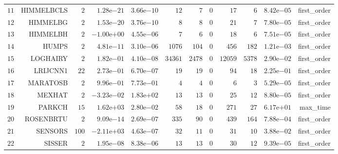 \begin{longtable}{rrrrrrrrrrrr}
  \(    11\) & HIMMELBCLS & \(     2\) & \( 1.28\)e\(-21\) & \( 3.66\)e\(-10\) & \(    12\) & \(     7\) & \(     0\) & \(    17\) & \(     6\) & \( 8.42\)e\(-05\) & first\_order \\
  \(    12\) & HIMMELBG & \(     2\) & \( 1.53\)e\(-20\) & \( 3.76\)e\(-10\) & \(     8\) & \(     8\) & \(     0\) & \(    21\) & \(     7\) & \( 7.80\)e\(-05\) & first\_order \\
  \(    13\) & HIMMELBH & \(     2\) & \(-1.00\)e\(+00\) & \( 4.55\)e\(-06\) & \(     7\) & \(     6\) & \(     0\) & \(    18\) & \(     6\) & \( 7.51\)e\(-05\) & first\_order \\
  \(    14\) & HUMPS & \(     2\) & \( 4.81\)e\(-11\) & \( 3.10\)e\(-06\) & \(  1076\) & \(   104\) & \(     0\) & \(   456\) & \(   182\) & \( 1.21\)e\(-03\) & first\_order \\
  \(    15\) & LOGHAIRY & \(     2\) & \( 1.82\)e\(-01\) & \( 4.10\)e\(-08\) & \( 34361\) & \(  2478\) & \(     0\) & \( 12059\) & \(  5378\) & \( 2.90\)e\(-02\) & first\_order \\
  \(    16\) & LRIJCNN1 & \(    22\) & \( 2.73\)e\(-01\) & \( 6.70\)e\(-07\) & \(    19\) & \(    19\) & \(     0\) & \(    94\) & \(    18\) & \( 2.25\)e\(-01\) & first\_order \\
  \(    17\) & MARATOSB & \(     2\) & \( 9.96\)e\(-01\) & \( 7.73\)e\(-01\) & \(     4\) & \(     4\) & \(     0\) & \(     6\) & \(     3\) & \( 5.29\)e\(-05\) & first\_order \\
  \(    18\) & MEXHAT & \(     2\) & \(-3.23\)e\(-02\) & \( 1.83\)e\(+02\) & \(    13\) & \(    13\) & \(     0\) & \(    25\) & \(    12\) & \( 8.80\)e\(-05\) & first\_order \\
  \(    19\) & PARKCH & \(    15\) & \( 1.62\)e\(+03\) & \( 2.80\)e\(-02\) & \(    58\) & \(    18\) & \(     0\) & \(   271\) & \(    27\) & \( 6.17\)e\(+01\) & max\_time \\
  \(    20\) & ROSENBRTU & \(     2\) & \( 9.09\)e\(-14\) & \( 2.69\)e\(-07\) & \(   335\) & \(    90\) & \(     0\) & \(   439\) & \(   164\) & \( 7.88\)e\(-04\) & first\_order \\
  \(    21\) & SENSORS & \(   100\) & \(-2.11\)e\(+03\) & \( 4.63\)e\(-07\) & \(    32\) & \(    11\) & \(     0\) & \(    31\) & \(    10\) & \( 3.88\)e\(-02\) & first\_order \\
  \(    22\) & SISSER & \(     2\) & \( 1.95\)e\(-08\) & \( 8.38\)e\(-06\) & \(    13\) & \(    13\) & \(     0\) & \(    30\) & \(    12\) & \( 9.39\)e\(-05\) & first\_order \\

\end{longtable}
